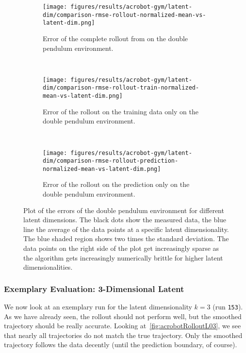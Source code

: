 			\begin{figure}
				\centering
				\begin{subfigure}{0.7\linewidth}
					\centering
					\texttt{[image: figures/results/acrobot-gym/latent-dim/comparison-rmse-rollout-normalized-mean-vs-latent-dim.png]}
					\caption[Error of the complete rollout on the double pendulum environment]{Error of the complete rollout from on the double pendulum environment.}
					\label{fig:acrobotRmseComplete}
				\end{subfigure} \\
				\begin{subfigure}{0.5\linewidth}
					\centering
					\texttt{[image: figures/results/acrobot-gym/latent-dim/comparison-rmse-rollout-train-normalized-mean-vs-latent-dim.png]}
					\caption[Error of the training rollout on the double pendulum environment]{Error of the rollout on the training data only on the double pendulum environment.}
					\label{fig:acrobotRmseTrain}
				\end{subfigure}%
				~
				\begin{subfigure}{0.5\linewidth}
					\centering
					\texttt{[image: figures/results/acrobot-gym/latent-dim/comparison-rmse-rollout-prediction-normalized-mean-vs-latent-dim.png]}
					\caption[Error of the prediction rollout on the double pendulum environment]{Error of the rollout on the prediction only on the double pendulum environment.}
					\label{fig:acrobotRmsePred}
				\end{subfigure}
				\caption[Errors on the double pendulum environment for different latent dimensions]{Plot of the errors of the double pendulum environment for different latent dimensions. The black dots show the measured data, the blue line the average of the data points at a specific latent dimensionality. The blue shaded region shows two times the standard deviation. The data points on the right side of the plot get increasingly sparse as the algorithm gets increasingly numerically brittle for higher latent dimensionalities.}
				\label{fig:acrobotRmse}
			\end{figure}

		\subsubsection{Exemplary Evaluation: 3-Dimensional Latent}
			We now look at an exemplary run for the latent dimensionality \( k = 3 \) (run \texttt{153}). As we have already seen, the rollout should not perform well, but the smoothed trajectory should be really accurate. Looking at~\autoref{fig:acrobotRolloutL03}, we see that nearly all trajectories do not match the true trajectory. Only the smoothed trajectory follows the data decently (until the prediction boundary, of course).


